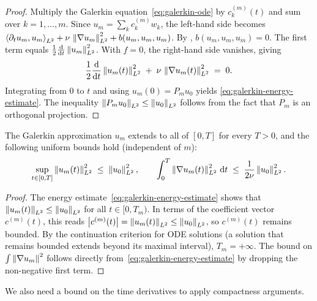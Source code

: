 \begin{proof}
  Multiply the Galerkin equation~\eqref{eq:galerkin-ode} by $c_{k}^{(m)}(t)$ and sum
  over $k = 1, \ldots, m$.  Since $u_{m} = \sum_{k} c_{k}^{(m)} w_{k}$, the left-hand
  side becomes
  $\left\langle \partial_{t} u_{m}, u_{m} \right\rangle_{L^{2}} + \nu\,\left\lVert \nabla u_{m} \right\rVert_{L^{2}}^{2}
  + b(u_{m}, u_{m}, u_{m})$.  By ,
  $b(u_{m}, u_{m}, u_{m}) = 0$.  The first term equals
  $\frac{1}{2}\frac{\mathrm{d}}{\mathrm{d} t}\left\lVert u_{m} \right\rVert_{L^{2}}^{2}$.  With $f = 0$, the
  right-hand side vanishes, giving
  \[
    \frac{1}{2}\frac{\mathrm{d}}{\mathrm{d} t}\left\lVert u_{m}(t) \right\rVert_{L^{2}}^{2}
    \;+\;
    \nu\,\left\lVert \nabla u_{m}(t) \right\rVert_{L^{2}}^{2}
    \;=\;
    0.
  \]
  Integrating from $0$ to $t$ and using $u_{m}(0) = P_{m} u_{0}$ yields
  \eqref{eq:galerkin-energy-estimate}.  The inequality
  $\left\lVert P_{m} u_{0} \right\rVert_{L^{2}} \le \left\lVert u_{0} \right\rVert_{L^{2}}$ follows from the fact that
  $P_{m}$ is an orthogonal projection.
\end{proof}

\begin{corollary}\label{cor:galerkin-global}
  The Galerkin approximation $u_{m}$ extends to all of $[0, T]$ for every $T > 0$, and
  the following uniform bounds hold (independent of $m$):
  \begin{equation}\label{eq:galerkin-uniform-bounds}
    \sup_{t \in [0, T]} \left\lVert u_{m}(t) \right\rVert_{L^{2}}^{2}
    \;\le\;
    \left\lVert u_{0} \right\rVert_{L^{2}}^{2},
    \qquad
    \int_{0}^{T} \left\lVert \nabla u_{m}(t) \right\rVert_{L^{2}}^{2} \,\mathrm{d} t
    \;\le\;
    \frac{1}{2\nu}\left\lVert u_{0} \right\rVert_{L^{2}}^{2}.
  \end{equation}
\end{corollary}

\begin{proof}
  The energy estimate~\eqref{eq:galerkin-energy-estimate} shows that
  $\left\lVert u_{m}(t) \right\rVert_{L^{2}} \le \left\lVert u_{0} \right\rVert_{L^{2}}$ for all $t \in [0, T_{m})$.
  In terms of the coefficient vector $c^{(m)}(t)$, this reads
  $\left\lvert c^{(m)}(t) \right\rvert = \left\lVert u_{m}(t) \right\rVert_{L^{2}} \le \left\lVert u_{0} \right\rVert_{L^{2}}$, so
  $c^{(m)}(t)$ remains bounded.  By the continuation criterion for ODE solutions (a
  solution that remains bounded extends beyond its maximal interval),
  $T_{m} = +\infty$.  The bound on $\int \left\lVert \nabla u_{m} \right\rVert^{2}$ follows directly
  from~\eqref{eq:galerkin-energy-estimate} by dropping the non-negative first term.
\end{proof}

We also need a bound on the time derivatives to apply compactness arguments.

